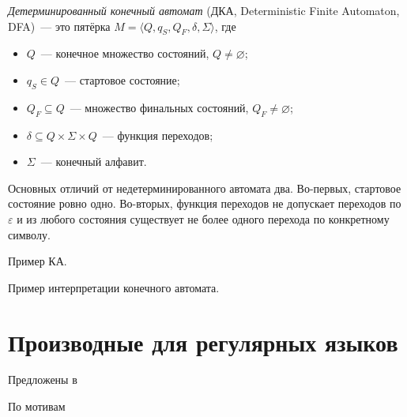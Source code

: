 \begin{definition}
    \label{def:DeterminicticFiniteAutomata}
    \emph{Детерминированный конечный автомат} (ДКА, Deterministic Finite Automaton, DFA)~--- это пятёрка $M = \langle Q, q_S, Q_F, \delta, \Sigma \rangle$, где
    \begin{itemize}
        \item $Q$~--- конечное множество состояний, $Q \neq \varnothing$;
        \item $q_S \in Q$~--- стартовое состояние;
        \item $Q_F \subseteq Q$~--- множество финальных состояний, $Q_F \neq \varnothing$;
        \item $\delta \subseteq Q \times \Sigma \times Q$~--- функция переходов;
        \item $\Sigma$~--- конечный алфавит.
    \end{itemize}
\end{definition}

Основных отличий от недетерминированного автомата два.
Во-первых, стартовое состояние ровно одно.
Во-вторых,  функция переходов не допускает переходов по $\varepsilon$ и из любого состояния существует не более одного перехода по конкретному символу.

\begin{example}
    Пример КА.

\end{example}

\begin{example}
    Пример интерпретации конечного автомата.
\end{example}

\section{Производные для регулярных языков}

Предложены в~

По мотивам~

